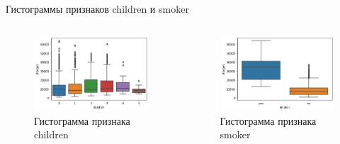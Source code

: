\documentclass[c]{beamer}  %
\begin{document}
	\begin{frame}
		\frametitle{\insertsection}

		\begin{block}{Гистограммы признаков children и smoker}
			\begin{columns}[onlytextwidth,T]
				\begin{figure}[H]
					\centering
					\includegraphics[scale=0.35]{children_boxplot.png}
					\caption{Гистограмма признака children}
					\label{img:children_boxplot}
				\end{figure}
				\begin{figure}[H]
					\centering
					\includegraphics[scale=0.35]{smoker_boxplot.png}
					\caption{Гистограмма признака smoker}
					\label{img:smoker_boxplot}
				\end{figure}
			\end{columns}
		\end{block}
	\end{frame}
\end{document}
